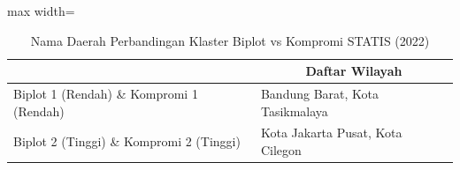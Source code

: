 \begin{table}[H]
\centering
\caption{Nama Daerah Perbandingan Klaster Biplot vs Kompromi STATIS (2022)} \label{tab:sample1biplot_comp_name_2022}
\begin{adjustbox}{max width=\textwidth}
\begin{tabular}{|>{\centering\arraybackslash}p{4cm}|p{10cm}|}
\hline
\multicolumn{1}{|c|}{\textbf{Kategori}} & \multicolumn{1}{c|}{\textbf{Daftar Wilayah}} \\
\hline
Biplot 1 (Rendah) \& Kompromi 1 (Rendah) & Bandung Barat, Kota Tasikmalaya \\
\hline
Biplot 2 (Tinggi) \& Kompromi 2 (Tinggi) & Kota Jakarta Pusat, Kota Cilegon \\
\hline
\end{tabular}
\end{adjustbox}
\end{table}